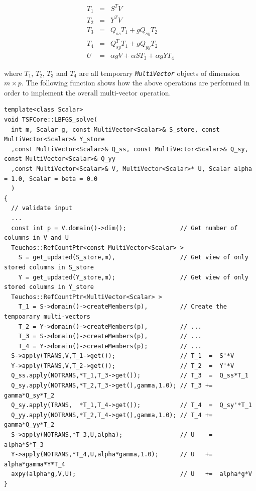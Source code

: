 \begin{eqnarray*}
T_1 & = & S^T V \\
T_2 & = & Y^T V \\
T_3 & = & Q_{ss} T_1 + g Q_{sy} T_2 \\
T_4 & = & Q_{sy}^T T_1 + g Q_{yy} T_2 \\
U   & = & \alpha g V + \alpha S T_3 + \alpha g Y T_4
\end{eqnarray*}

{}\noindent{}where $T_1$, $T_2$, $T_3$ and $T_4$ are all temporary
{}\texttt{\textit{Multi\-Vector}} objects of dimension $m \times p$.
The following function shows how the above operations are performed in
order to implement the overall multi-vector operation.

{\scriptsize\begin{verbatim}
template<class Scalar>
void TSFCore::LBFGS_solve(
  int m, Scalar g, const MultiVector<Scalar>& S_store, const MultiVector<Scalar>& Y_store
  ,const MultiVector<Scalar>& Q_ss, const MultiVector<Scalar>& Q_sy, const MultiVector<Scalar>& Q_yy
  ,const MultiVector<Scalar>& V, MultiVector<Scalar>* U, Scalar alpha = 1.0, Scalar = beta = 0.0
  )
{
  // validate input
  ...
  const int p = V.domain()->dim();               // Get number of columns in V and U
  Teuchos::RefCountPtr<const MultiVector<Scalar> >
    S = get_updated(S_store,m),                  // Get view of only stored columns in S_store
    Y = get_updated(Y_store,m);                  // Get view of only stored columns in Y_store
  Teuchos::RefCountPtr<MultiVector<Scalar> >
    T_1 = S->domain()->createMembers(p),         // Create the tempoarary multi-vectors
    T_2 = Y->domain()->createMembers(p),         // ...
    T_3 = S->domain()->createMembers(p),         // ...
    T_4 = Y->domain()->createMembers(p);         // ...
  S->apply(TRANS,V,T_1->get());                  // T_1  =  S'*V
  Y->apply(TRANS,V,T_2->get());                  // T_2  =  Y'*V
  Q_ss.apply(NOTRANS,*T_1,T_3->get());           // T_3  =  Q_ss*T_1
  Q_sy.apply(NOTRANS,*T_2,T_3->get(),gamma,1.0); // T_3 +=  gamma*Q_sy*T_2
  Q_sy.apply(TRANS,  *T_1,T_4->get());           // T_4  =  Q_sy'*T_1
  Q_yy.apply(NOTRANS,*T_2,T_4->get(),gamma,1.0); // T_4 +=  gamma*Q_yy*T_2
  S->apply(NOTRANS,*T_3,U,alpha);                // U    =  alpha*S*T_3
  Y->apply(NOTRANS,*T_4,U,alpha*gamma,1.0);      // U   +=  alpha*gamma*Y*T_4
  axpy(alpha*g,V,U);                             // U   +=  alpha*g*V
}
\end{verbatim}}

